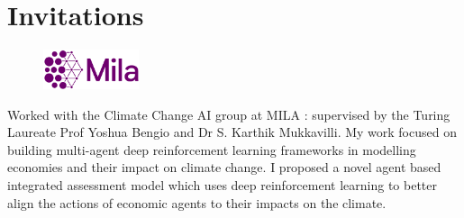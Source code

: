 \documentclass[]{deedy-resume-openfont}
\begin{document}
\begin{minipage}[t]{0.66\textwidth}

\section{Invitations}



\begin{figure}
  \begin{center}
    \includegraphics[width=0.25\textwidth]{mila.png}
  \end{center}
\end{figure}
Worked with the Climate Change AI group at MILA : supervised by the Turing Laureate Prof Yoshua Bengio and Dr S. Karthik Mukkavilli. My work focused on building multi-agent deep reinforcement learning frameworks in modelling economies and their impact on climate change. I proposed a novel agent based integrated assessment model which uses deep reinforcement learning to better align the actions of economic agents to their impacts on the climate.
\newline
\sectionsep



\end{minipage}
\end{document}
